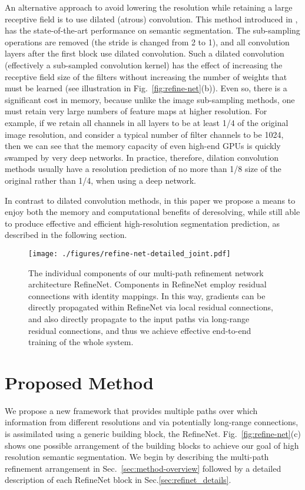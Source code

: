 \documentclass[10pt,twocolumn,letterpaper]{article}
\newcommand{\Fig}{Fig.\xspace}
\newcommand{\Sec}{Sec.\xspace}
\newcommand{\refOurFig}{\ref{fig:refine-net}(c)\xspace}
\begin{document}
An alternative approach to avoid lowering the resolution while retaining a large receptive field is to use dilated (atrous) convolution.  This method introduced in \cite{ChenPK0Y16}, has the state-of-the-art performance on semantic segmentation.  The sub-sampling operations are removed (the stride is changed from 2 to 1), and all convolution layers after the first block use dilated convolution.  Such a dilated convolution (effectively a sub-sampled convolution kernel) has the effect of increasing the receptive field size of the filters without increasing the number of weights that must be learned (see illustration in \Fig~\ref{fig:refine-net}(b)). Even so, there is a significant cost in memory, because unlike the image sub-sampling methods, one must retain very large numbers of feature maps at higher resolution.  For example, if we retain all channels in all layers to be at least 1/4 of the original image resolution, and consider a typical number of filter channels to be 1024, then we can see that the memory capacity of even high-end GPUs is quickly swamped by very deep networks.  In practice, therefore, dilation convolution methods usually have a resolution prediction of no more than 1/8 size of the original rather than 1/4, when using a deep network. 
  


In contrast to dilated convolution methods, in this paper we propose a means to enjoy both the memory and computational benefits of deresolving, while still able to produce effective and efficient high-resolution segmentation prediction, as described in the following section.

\begin{figure*}[t]
	\centering	
	\texttt{[image: ./figures/refine-net-detailed\_joint.pdf]}	
\caption{The individual components of our multi-path refinement network architecture RefineNet. Components in RefineNet employ residual connections with identity mappings. In this way, gradients can be directly propagated  within RefineNet via local residual connections, and also directly propagate to the input paths via long-range residual connections, 
and thus we achieve effective end-to-end training of the whole system.}
\label{fig:refine-net-detailed-joint}
\end{figure*}\section{Proposed Method}\label{sec:refine-net}

We propose a new framework that provides multiple paths over which information from different resolutions and via potentially long-range connections, is assimilated using a generic building block, the RefineNet. \Fig~\refOurFig shows one possible arrangement of the building blocks to achieve our goal of high resolution semantic segmentation.  We begin by describing the multi-path refinement arrangement in \Sec~\ref{sec:method-overview} followed by a detailed description of each RefineNet block in \Sec\ref{sec:refinet_details}.
\end{document}
